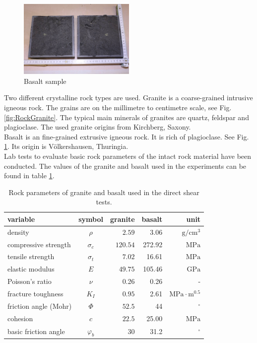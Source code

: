 \begin{figure}[!ht]
\begin{center}
\includegraphics[width=0.5\textwidth]{./figures/ExpRockBasalt.jpg}
\end{center}
\caption{Basalt sample}
\label{fig:RockBasalt}
\end{figure}

Two different crystalline rock  types are used. Granite is a coarse-grained intrusive igneous rock. The grains are on the millimetre to centimetre scale, see Fig. \ref{fig:RockGranite}. The typical main minerals of granites are quartz, feldspar and plagioclase. The used granite origins from Kirchberg, Saxony.\\
Basalt is an fine-grained extrusive igneous rock. It is rich of plagioclase. See Fig. \ref{fig:RockBasalt}. Its origin is V\"olkershausen, Thuringia.\\
Lab tests to evaluate basic rock parameters of the intact rock material have been conducted. The values of the granite and basalt used in the experiments can be found in table \ref{table:MEX7_rockParam}.\\
\begin{table}[!ht]
\begin{center}
\begin{tabular}{l c r r r}
variable & symbol & granite & basalt & unit\\
\hline
density & $\rho$ & $2.59$ &3.06 &$\text{g}/\text{cm}^3$\\
compressive strength & $\sigma_c$ & $120.54$&272.92 &$\text{MPa}   $\\
tensile strength & $\sigma_t$ & $7.02$&16.61 &$ \text{MPa}   $\\
elastic modulus & $E$ & $49.75$&105.46 &$ \text{GPa}   $\\
Poisson's ratio & $\nu$ & 0.26 & 0.26  & -\\
fracture toughness & $K_I$ & $0.95$& 2.61 &$\text{MPa}\cdot\text{m}^{0.5}$\\
friction angle (Mohr) & $\Phi$ &  $52.5$& 44 &$^\circ$\\
cohesion & $c$ &  $22.5$& 25.00  &$ \text{MPa}   $\\
basic friction angle &$\varphi_b$ &30 & 31.2 & $^\circ$\\
\end{tabular}
\caption{Rock parameters of granite and basalt used in the direct shear tests.}
\label{table:MEX7_rockParam}
\end{center}
\end{table}

